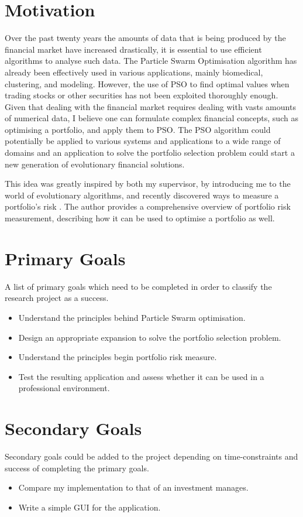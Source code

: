   \section{Motivation} %
  \label{sec:motivation}
  Over the past twenty years the amounts of data that is being produced by the financial market have increased drastically, it is essential to use efficient algorithms to analyse such data. The Particle Swarm Optimisation algorithm has already been effectively used in various applications, mainly  biomedical, clustering, and modeling. However, the use of PSO to find optimal values when trading stocks or other securities has not been exploited thoroughly enough. Given that dealing with the financial market requires dealing with vasts amounts of numerical data, I believe one can formulate complex financial concepts, such as optimising a portfolio, and apply them to PSO. The PSO algorithm could potentially be applied to various systems and applications to a wide range of domains and an application to solve the portfolio selection problem could start a new generation of evolutionary financial solutions. 
  
  This idea was greatly inspired by both my supervisor, by introducing me to the world of evolutionary algorithms, and recently discovered ways to measure a portfolio's risk \cite{two_sided_risk}. The author provides a comprehensive overview of portfolio risk measurement, describing how it can be used to optimise a portfolio as well.

  \section{Primary Goals} %
  \label{sec:primary_goals}
  A list of primary goals which need to be completed in order to classify the research project as a success.
  \begin{itemize}
    \item Understand the principles behind Particle Swarm optimisation.
    \item Design an appropriate expansion to solve the portfolio selection problem.
    \item Understand the principles begin portfolio risk measure.
    \item Test the resulting application and assess whether it can be used in a professional environment.
  \end{itemize}

  \section{Secondary Goals} %
  \label{sec:secondary_goals}
  Secondary goals could be added to the project depending on time-constraints and success of completing the primary goals.
  \begin{itemize}
    \item Compare my implementation to that of an investment manages. 
    \item Write a simple GUI for the application.
  \end{itemize}
